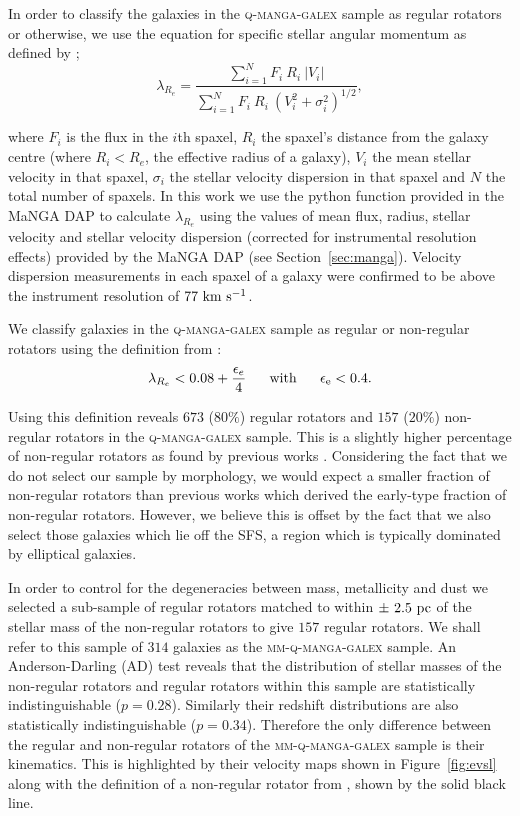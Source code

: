 \documentclass[useAMS,usenatbib]{mn2e}
\begin{document}
In order to classify the galaxies in the \textsc{q-manga-galex} sample as regular rotators or otherwise, we use the equation for specific stellar angular momentum as defined by \cite{emsellem07, emsellem11};
\begin{equation}
\lambda_{R_{e}} = \frac{\sum_{i=1}^{N} F_i\ R_i\ |V_i|}{\sum_{i=1}^{N} F_i\ R_i\ (V_i^2 + \sigma_i^2)^{1/2}},
\end{equation}	

where $F_i$ is the flux in the $i$th spaxel, $R_i$ the spaxel's distance from the galaxy centre (where $R_i < R_e$, the effective radius of a galaxy), $V_i$ the mean stellar velocity in that spaxel, $\sigma_i$ the stellar velocity dispersion in that spaxel and $N$ the total number of spaxels. In this work we use the python function provided in the MaNGA DAP to calculate $\lambda_{R_{e}}$ using the values of mean flux, radius, stellar velocity and stellar velocity dispersion (corrected for instrumental resolution effects) provided  by the MaNGA DAP (see Section~\ref{sec:manga}). Velocity dispersion measurements in each spaxel of a galaxy were confirmed to be above the instrument resolution of $77~\rm{km}~\rm{s}^{-1}$.

We classify galaxies in the \textsc{q-manga-galex} sample as regular or non-regular rotators using the definition from \cite{cappellari16}:
\begin{equation}
\lambda_{R_{e}} < 0.08 + \frac{\epsilon_e}{4} ~~~~~ \rm{with} ~~~~~ \epsilon_e < 0.4.
\end{equation}

Using this definition reveals $673$ ($80\%$) regular rotators and $157$ ($20\%$) non-regular rotators in the \textsc{q-manga-galex} sample. 
This is a slightly higher percentage of non-regular rotators as found by previous works \citep[$14-17\%$ of early-types; ][]{emsellem11, stott16}. Considering the fact that we do not select our sample by morphology, we would expect a smaller fraction of non-regular rotators than previous works which derived the early-type fraction of non-regular rotators. However, we believe this is offset by the fact that we also select those galaxies which lie off the SFS, a region which is typically dominated by elliptical galaxies.   

In order to control for the degeneracies between mass, metallicity and dust we selected a sub-sample of regular rotators matched to within $\pm~2.5~\rm{pc}$ of the stellar mass of the non-regular rotators to give $157$ regular rotators. We shall refer to this sample of $314$ galaxies as the \textsc{mm-q-manga-galex} sample. An Anderson-Darling (AD) test reveals that the distribution of stellar masses of the non-regular rotators and regular rotators within this sample are statistically indistinguishable ($p=0.28$). Similarly their redshift distributions are also statistically indistinguishable ($p=0.34$). Therefore the only difference between the regular and non-regular rotators of the \textsc{mm-q-manga-galex} sample is their kinematics. This is highlighted by their velocity maps shown in Figure~\ref{fig:evsl} along with the definition of a non-regular rotator from \cite{cappellari16}, shown by the solid black line. 
\end{document}
